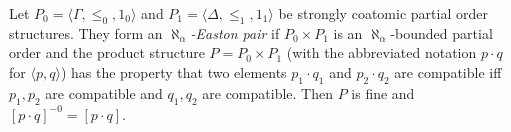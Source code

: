 Let $P_0 = \langle \Gamma, \leq_0, 1_0 \rangle$ and $P_1 = \langle \Delta, \leq_1, 1_1 \rangle$ be strongly coatomic partial order structures. They form an \emph{$\aleph_\alpha$-Easton pair} if $P_0 \times P_1$ is an $\aleph_\alpha$-bounded partial order and the product structure $P = P_0 \times P_1$ (with the abbreviated notation $p \cdot q$ for $\langle p, q \rangle$) has the property that two elements $p_1 \cdot q_1$ and $p_2 \cdot q_2$ are compatible iff $p_1, p_2$ are compatible and $q_1, q_2$ are compatible. Then $P$ is fine and $[p \cdot q]^{-0} = [p \cdot q]$.
